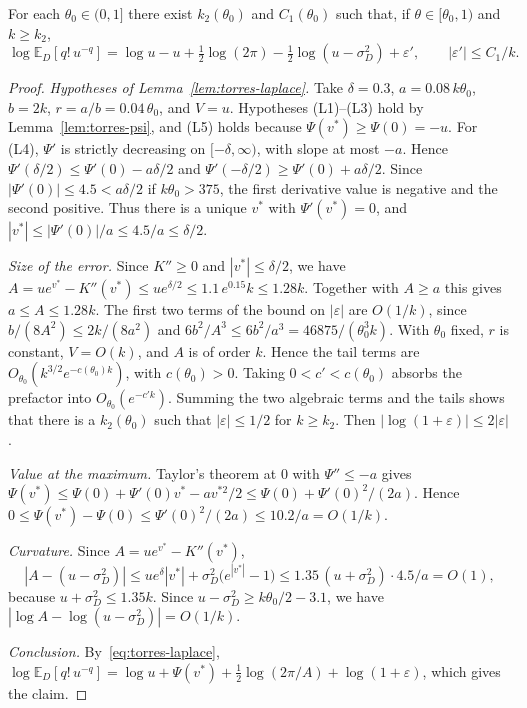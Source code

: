 \begin{proposicion}\label{prop:torres-laplace}
For each $\theta_0\in(0,1]$ there exist $k_2(\theta_0)$ and $C_1(\theta_0)$ such that, if
$\theta\in[\theta_0,1)$ and
$k\ge k_2$,
\[
 \log\mathbb E_D[q!\,u^{-q}]=\log u-u+\tfrac12\log(2\pi)-\tfrac12\log(u-\sigma_D^2)+\varepsilon',\qquad
 |\varepsilon'|\le C_1/k.
\]
\end{proposicion}
\begin{proof}
\emph{Hypotheses of Lemma~\ref{lem:torres-laplace}.} Take $\delta=0.3$, $a=0.08\,k\theta_0$, $b=2k$,
$r=a/b=0.04\,\theta_0$, and $V=u$. Hypotheses (L1)--(L3) hold by Lemma~\ref{lem:torres-psi}, and
(L5) holds because $\Psi(v^*)\ge\Psi(0)=-u$. For (L4), $\Psi'$ is strictly decreasing on
$[-\delta,\infty)$, with slope at most $-a$. Hence $\Psi'(\delta/2)\le\Psi'(0)-a\delta/2$ and
$\Psi'(-\delta/2)\ge\Psi'(0)+a\delta/2$. Since $|\Psi'(0)|\le4.5<a\delta/2$ if $k\theta_0>375$, the first
derivative value is negative and the second positive. Thus there is a unique $v^*$ with $\Psi'(v^*)=0$, and
$|v^*|\le|\Psi'(0)|/a\le4.5/a\le\delta/2$.

\emph{Size of the error.} Since $K''\ge0$ and $|v^*|\le\delta/2$,
we have $A=ue^{v^*}-K''(v^*)\le ue^{\delta/2}\le1.1\,e^{0.15}k\le1.28k$. Together with $A\ge a$ this gives
$a\le A\le1.28k$. The first two terms of the bound on $|\varepsilon|$ are $O(1/k)$,
since $b/(8A^2)\le2k/(8a^2)$ and $6b^2/A^3\le6b^2/a^3=46875/(\theta_0^3k)$. With $\theta_0$ fixed, $r$ is
constant,
$V=O(k)$, and $A$ is of order $k$. Hence the tail terms are
$O_{\theta_0}(k^{3/2}e^{-c(\theta_0)k})$, with $c(\theta_0)>0$. Taking $0<c'<c(\theta_0)$ absorbs the
prefactor into $O_{\theta_0}(e^{-c'k})$. Summing the two algebraic terms and the tails shows that there is a
$k_2(\theta_0)$ such that $|\varepsilon|\le1/2$ for $k\ge k_2$. Then
$|\log(1+\varepsilon)|\le2|\varepsilon|$.

\emph{Value at the maximum.} Taylor's theorem at $0$ with $\Psi''\le-a$ gives
$\Psi(v^*)\le\Psi(0)+\Psi'(0)v^*-av^{*2}/2\le\Psi(0)+\Psi'(0)^2/(2a)$. Hence
$0\le\Psi(v^*)-\Psi(0)\le\Psi'(0)^2/(2a)\le10.2/a=O(1/k)$.

\emph{Curvature.} Since $A=ue^{v^*}-K''(v^*)$,
\[
 |A-(u-\sigma_D^2)|\le
ue^{\delta}|v^*|+\sigma_D^2\bigl(e^{|v^*|}-1\bigr)\le1.35\,(u+\sigma_D^2)\cdot4.5/a=O(1),
\]
because $u+\sigma_D^2\le1.35k$. Since $u-\sigma_D^2\ge k\theta_0/2-3.1$, we have
$|\log A-\log(u-\sigma_D^2)|=O(1/k)$.

\emph{Conclusion.} By~\eqref{eq:torres-laplace},
$\log\mathbb E_D[q!\,u^{-q}]=\log u+\Psi(v^*)+\frac12\log(2\pi/A)+\log(1+\varepsilon)$, which gives the
claim.
\end{proof}

